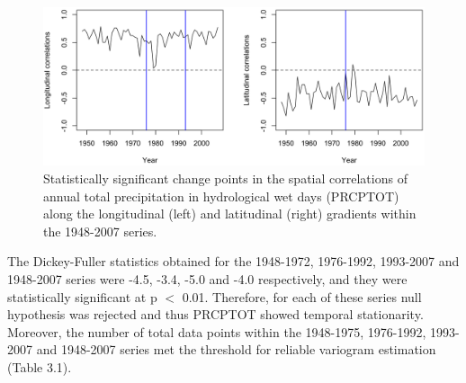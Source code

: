 \begin{figure}[t]
  \centering
  \includegraphics[width=\textwidth]{Figures/Fig_3_4.png}
  \caption{Statistically significant change points in the spatial correlations of annual total precipitation in hydrological wet days (PRCPTOT) along the longitudinal (left) and latitudinal (right) gradients within the 1948-2007 series.}
  \label{Fig_3_4}
\end{figure}

The Dickey-Fuller statistics obtained for the 1948-1972, 1976-1992, 1993-2007 and 1948-2007 series were -4.5, -3.4, -5.0 and -4.0 respectively, and they were statistically significant at p $<$ 0.01. Therefore, for each of these series null hypothesis was rejected and thus PRCPTOT showed temporal stationarity. Moreover, the number of total data points within the 1948-1975, 1976-1992, 1993-2007 and 1948-2007 series met the threshold for reliable variogram estimation (Table 3.1).

